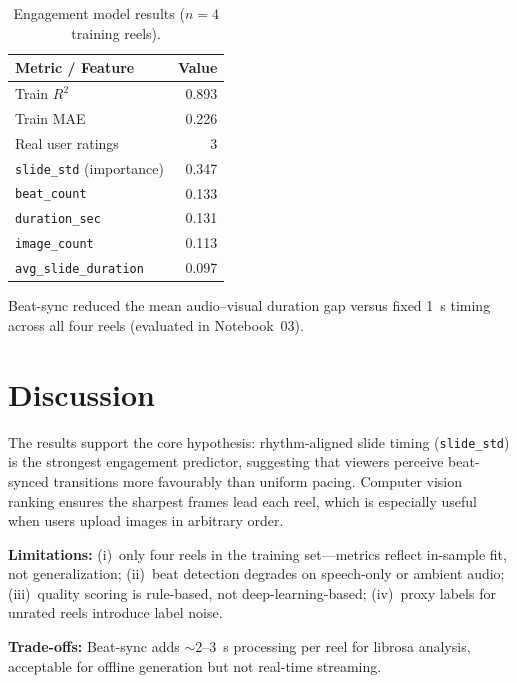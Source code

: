 \documentclass{article}
\begin{document}
\begin{table}[t]
\centering
\caption{Engagement model results ($n=4$ training reels).}
\label{tab:ml}
\scriptsize
\begin{tabular}{l r}
\toprule
\textbf{Metric / Feature} & \textbf{Value} \\
\midrule
Train $R^2$              & 0.893 \\
Train MAE                & 0.226 \\
Real user ratings        & 3 \\
\midrule
\texttt{slide\_std} (importance)     & 0.347 \\
\texttt{beat\_count}                 & 0.133 \\
\texttt{duration\_sec}               & 0.131 \\
\texttt{image\_count}                & 0.113 \\
\texttt{avg\_slide\_duration}        & 0.097 \\
\bottomrule
\end{tabular}
\end{table}

Beat-sync reduced the mean audio--visual duration gap versus fixed 1~s timing across all four reels (evaluated in Notebook~03).

\section{Discussion}
\label{sec:discussion}

The results support the core hypothesis: rhythm-aligned slide timing (\texttt{slide\_std}) is the strongest engagement predictor, suggesting that viewers perceive beat-synced transitions more favourably than uniform pacing.
Computer vision ranking ensures the sharpest frames lead each reel, which is especially useful when users upload images in arbitrary order.

\textbf{Limitations:} (i)~only four reels in the training set---metrics reflect in-sample fit, not generalization; (ii)~beat detection degrades on speech-only or ambient audio; (iii)~quality scoring is rule-based, not deep-learning-based; (iv)~proxy labels for unrated reels introduce label noise.

\textbf{Trade-offs:} Beat-sync adds $\sim$2--3~s processing per reel for librosa analysis, acceptable for offline generation but not real-time streaming.

\end{document}
